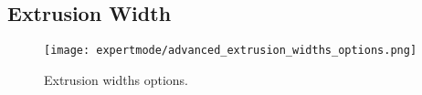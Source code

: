 
\subsection{Extrusion Width} %
\label{sec:extrusion_width}

\begin{figure}[H]
\centering
\texttt{[image: expertmode/advanced\_extrusion\_widths\_options.png]}
\caption{Extrusion widths options.}
\label{fig:advanced_extrusion_widths_options}
\end{figure}


